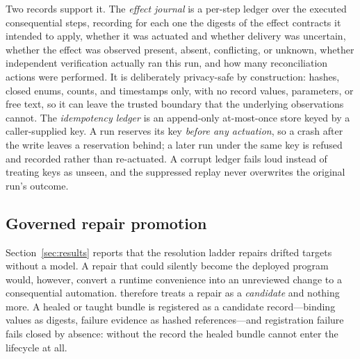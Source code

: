 Two records support it. The \emph{effect journal} is a per-step ledger over the
executed consequential steps, recording for each one the digests of the effect
contracts it intended to apply, whether it was actuated and whether delivery was
uncertain, whether the effect was observed present, absent, conflicting, or
unknown, whether independent verification actually ran this run, and how many
reconciliation actions were performed. It is deliberately privacy-safe by
construction: hashes, closed enums, counts, and timestamps only, with no record
values, parameters, or free text, so it can leave the trusted boundary that the
underlying observations cannot. The \emph{idempotency ledger} is an
append-only at-most-once store keyed by a caller-supplied key. A run reserves
its key \emph{before any actuation}, so a crash after the write leaves a
reservation behind; a later run under the same key is refused and recorded
rather than re-actuated. A corrupt ledger fails loud instead of treating keys as
unseen, and the suppressed replay never overwrites the original run's outcome.

\subsection{Governed repair promotion}
Section~\ref{sec:results} reports that the resolution ladder repairs drifted
targets without a model. A repair that could silently become the deployed
program would, however, convert a runtime convenience into an unreviewed change
to a consequential automation. \system{} therefore treats a repair as a
\emph{candidate} and nothing more. A healed or taught bundle is registered as a
candidate record---binding values as digests, failure evidence as hashed
references---and registration failure fails closed by absence: without the
record the healed bundle cannot enter the lifecycle at all.

